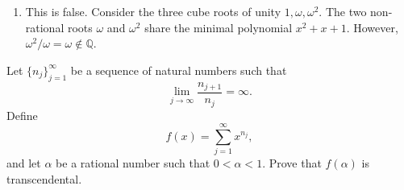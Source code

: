\documentclass[12 pt, letterpaper]{hmcpset}
\begin{document}
\begin{solution}
\begin{enumerate}
			Notice that $\deg f_{\gamma} = \deg f$ and $\deg g_{1 / \gamma} = \deg g$. The polynomial divisions we argued for above imply that $\deg f = \deg f_{\gamma} \le \deg g$ and $\deg g = \deg g_{1 / \gamma} \le \deg f$. Thus, $\deg f = \deg f_{\gamma} = \deg g$. Since $f_{\gamma}$ is a rational polynomial of degree $\deg g$ dividing $g$, we must have $g(x) = \lambda f_{\gamma}(x)$ for some $\lambda \in \mathbb{Q}^{\times}$. In particular, $\lambda$ clears all the denominators in $f_{\gamma}$ so that it has integer coefficients with no common factors. That is,
			\[
				g(x) = \lambda \sum_{k = 0}^{n} a_{k} \gamma^{k} x^{k}
			\]
			where $\lambda = q^{n}$ for $\gamma = p / q$ in least terms.

		\item This is false. Consider the three cube roots of unity $1, \omega, \omega^{2}$. The two non-rational roots $\omega$ and $\omega^{2}$ share the minimal polynomial $x^{2} + x + 1$. However, $\omega^{2} / \omega = \omega \notin \mathbb{Q}$.
	\end{enumerate}
\end{solution}

\pagebreak

\begin{problem}[Problem 7.]
	Let $\{ n_{j} \}_{j = 1}^{\infty}$ be a sequence of natural numbers such that
	\[
		\lim_{j \to \infty} \frac{n_{j + 1}}{n_{j}} = \infty.
	\]
	Define
	\[
		f(x) = \sum_{j = 1}^{\infty} x^{n_{j}},
	\]
	and let $\alpha$ be a rational number such that $0 < \alpha < 1$. Prove that $f(\alpha)$ is transcendental.
\end{problem}
\end{document}
